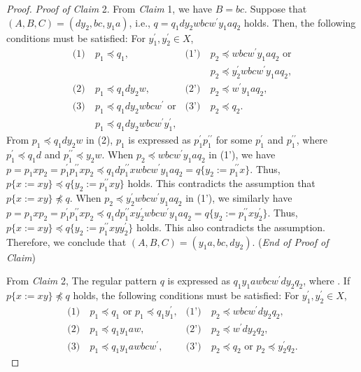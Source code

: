 \begin{proof}
  \smallskip
  \noindent
  \textit{Proof of Claim} 2.
  From \textit{Claim} 1, we have $B=bc$. Suppose that $(A, B, C) = (dy_{2}, bc, y_{1}a)$, i.e., $q = q_{1}dy_{2}wbcw^{\prime}y_{1}aq_{2} $ holds.
  Then, the following conditions must be satisfied: For $y_{1}^{\prime},y_{2}^{\prime}\in X$,
  \begin{align*}
  \textrm{(1)}~& p_{1} \preceq q_{1}, & \textrm{(1')}~& p_{2} \preceq wbcw^{\prime}y_{1}aq_{2}\mbox{ or}\\
  & & & p_{2} \preceq y_{2}^{\prime}wbcw^{\prime}y_{1}aq_{2},\\
  \textrm{(2)}~& p_{1} \preceq q_{1}dy_{2}w, & \textrm{(2')}~& p_{2} \preceq w^{\prime}y_{1}aq_{2}, \\
  \textrm{(3)}~& p_{1} \preceq q_{1}dy_{2}wbcw^{\prime}\mbox{ or} & \textrm{(3')}~& p_{2} \preceq q_{2}.\\
  & p_{1} \preceq q_{1}dy_{2}wbcw^{\prime}y_{1}^{\prime},& &
  \end{align*}
  From $p_{1} \preceq q_{1}dy_{2}w$ in (2), $p_{1}$ is expressed as $p^{\prime}_{1}p^{\prime\prime}_{1}$ for some $p^{\prime}_{1}$ and $p^{\prime\prime}_{1}$, where $p^{\prime}_{1} \preceq q_{1}d$ and $p^{\prime\prime}_{1} \preceq y_{2}w$. 
  When $p_{2} \preceq wbcw^{\prime}y_{1}aq_{2}$ in (1'), we have $p=p_{1}xp_{2}=p^{\prime}_{1}p^{\prime\prime}_{1}xp_{2} \preceq q_{1}dp^{\prime\prime}_{1}xwbcw^{\prime}y_{1}aq_{2}=q \{ y_{2}:=p^{\prime\prime}_{1}x \}$.
  Thus, $p \{ x := xy \} \preceq q \{ y_{2}:=p^{\prime\prime}_{1}xy \}$ holds.
  This contradicts the assumption that $p \{ x := xy \} \not \preceq q$.
  When $p_{2} \preceq y_{2}^{\prime}wbcw^{\prime}y_{1}aq_{2}$ in (1'), we similarly have $p=p_{1}xp_{2}=p^{\prime}_{1}p^{\prime\prime}_{1}xp_{2} \preceq q_{1}dp^{\prime\prime}_{1}xy_{2}^{\prime}wbcw^{\prime}y_{1}aq_{2}=q \{ y_{2}:=p^{\prime\prime}_{1}xy_{2}^{\prime} \}$.
  Thus, $p \{ x := xy \} \preceq q \{ y_{2}:=p^{\prime\prime}_{1}xyy_{2}^{\prime} \}$ holds.
  This also contradicts the assumption.
  Therefore, we conclude that $(A, B, C) = (y_{1}a, bc, dy_{2})$.
  (\textit{End of Proof of Claim})

  \smallskip

  From \textit{Claim} 2, The regular pattern $q$ is expressed as $q_{1}y_{1}awbcw^{\prime}dy_{2}q_{2}$, where \TheConditionA.
  If $p \{ x := xy \} \not \preceq q$ holds, the following conditions must be satisfied:
  For $y_{1}^{\prime},y_{2}^{\prime}\in X$,
  \begin{align*}
    \textrm{(1)}~& p_{1} \preceq q_{1} \mbox{ or } p_{1} \preceq q_{1}y_{1}^{\prime}, & \textrm{(1')}~& p_{2} \preceq wbcw^{\prime}dy_{2}q_{2}, \\
    \textrm{(2)}~& p_{1} \preceq q_{1}y_{1}aw, & \textrm{(2')}~& p_{2} \preceq w^{\prime}dy_{2}q_{2}, \\
    \textrm{(3)}~& p_{1} \preceq q_{1}y_{1}awbcw^{\prime}, & \textrm{(3')}~& p_{2} \preceq q_{2} \mbox{ or } p_{2} \preceq y_{2}^{\prime}q_{2}.
  \end{align*}


\end{proof}
